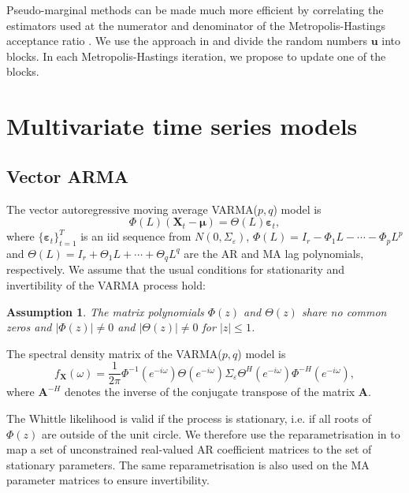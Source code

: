 \documentclass[11pt,english,oneside]{amsart}
\numberwithin{equation}{section}
\theoremstyle{plain}
\newtheorem{assumption}{Assumption} %
\numberwithin{equation}{section}
\renewcommand{\v}[1]{\boldsymbol{#1}}
\begin{document}
Pseudo-marginal methods can be made much more efficient by correlating the estimators used at the numerator and denominator of the Metropolis-Hastings acceptance ratio \citep{deligiannidis2018correlated, Tran2016block, quiroz2020block}. We use the approach in \cite{Tran2016block} and divide the random numbers $\v u$ into blocks. In each Metropolis-Hastings iteration, we propose to update one of the blocks.   


\section{Multivariate time series models}\label{sec:Models}
\subsection{Vector ARMA}\label{subsec:VARMA}
The vector autoregressive moving average VARMA($p,q$) model is
\begin{equation}
    \Phi(L)(\mathbf{X}_t-\boldsymbol \mu) = \Theta(L)\boldsymbol{\varepsilon}_t,
\end{equation}
where $\{ \boldsymbol{\varepsilon}_t  \}_{t=1}^T$
is an iid sequence from $N(0,\Sigma_\varepsilon)$, 
$\Phi(L) = I_r - \Phi_1L - \cdots - \Phi_pL^p$ and $\Theta(L) = I_r + \Theta_1L + \cdots + \Theta_qL^q$ are the AR and MA 
lag polynomials, respectively. We assume that the usual conditions for stationarity and invertibility of the VARMA process hold:
\begin{assumption}\label{ass:VARMAroots}
    The matrix polynomials $\Phi(z)$ and $\Theta(z)$ share no common zeros and $|\Phi(z)|\neq 0$ and $|\Theta(z)| \neq 0$ for $|z| \leq 1$.
\end{assumption}

The spectral density matrix of the VARMA($p,q$) model is \citep[Ch. 11]{brockwell1991time}
\begin{equation}
    f_{\mathbf{X}}(\omega) = \frac{1}{2\pi}\Phi^{-1}(e^{-i\omega})\Theta(e^{-i\omega}) \Sigma_{\varepsilon} \Theta^H(e^{-i\omega})  \Phi^{-H}(e^{-i\omega}),
\end{equation}
where $\v A^{-H}$ denotes the inverse of the conjugate transpose of the matrix $\v A$.

The Whittle likelihood is valid if the process is  stationary, i.e. if all roots of $\Phi(z)$ are outside of the unit circle. We therefore use the reparametrisation in \cite{ansley1986note} to map a set of unconstrained real-valued AR coefficient matrices to the set of stationary parameters. The same reparametrisation is also used on the MA parameter matrices to ensure invertibility.
\end{document}
